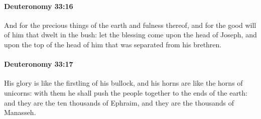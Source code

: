 		\paragraph{Deuteronomy 33:16} %
			\label{DEUTERONOMY-33-16}

			And for the precious things of the earth and fulness thereof, and for the good will of him that dwelt in the bush: let the blessing come upon the head of Joseph, and upon the top of the head of him that was separated from his brethren.


		\paragraph{Deuteronomy 33:17} %
			\label{DEUTERONOMY-33-17}

			His glory is like the firstling of his bullock, and his horns are like the horns of unicorns: with them he shall push the people together to the ends of the earth: and they are the ten thousands of Ephraim, and they are the thousands of Manasseh.

